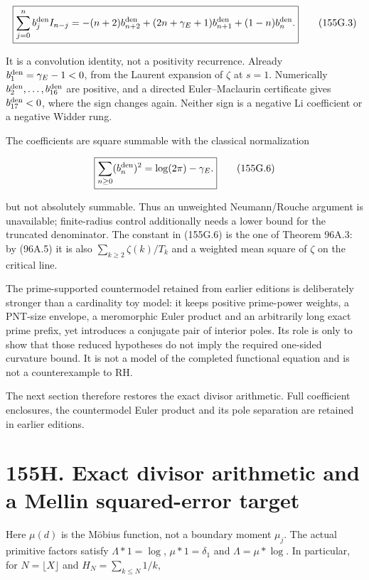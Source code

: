 \documentclass[
  11pt,
]{book}
\begin{document}
\[
\boxed{\sum_{j=0}^n b_j^{\rm den}I_{n-j}
=-(n+2)b_{n+2}^{\rm den}+(2n+\gamma_E+1)b_{n+1}^{\rm den}
 +(1-n)b_n^{\rm den}.}
\tag{155G.3}
\]

It is a convolution identity, not a positivity recurrence. Already
\(b_1^{\rm den}=\gamma_E-1<0\), from the Laurent expansion of \(\zeta\)
at \(s=1\). Numerically \(b_2^{\rm den},\ldots,b_{16}^{\rm den}\) are
positive, and a directed Euler--Maclaurin certificate gives
\(b_{17}^{\rm den}<0\), where the sign changes again. Neither sign is a
negative Li coefficient or a negative Widder rung.

The coefficients are square summable with the classical normalization

\[
\boxed{\sum_{n\ge0}(b_n^{\rm den})^2=\log(2\pi)-\gamma_E.}
\tag{155G.6}
\]

but not absolutely summable. Thus an unweighted Neumann/Rouche argument
is unavailable; finite-radius control additionally needs a lower bound
for the truncated denominator. The constant in (155G.6) is the one of
Theorem 96A.3: by (96A.5) it is also \(\sum_{k\ge2}\zeta(k)/T_k\) and a
weighted mean square of \(\zeta\) on the critical line.

The prime-supported countermodel retained from earlier editions is
deliberately stronger than a cardinality toy model: it keeps positive
prime-power weights, a PNT-size envelope, a meromorphic Euler product
and an arbitrarily long exact prime prefix, yet introduces a conjugate
pair of interior poles. Its role is only to show that those reduced
hypotheses do not imply the required one-sided curvature bound. It is
not a model of the completed functional equation and is not a
counterexample to RH.

The next section therefore restores the exact divisor arithmetic. Full
coefficient enclosures, the countermodel Euler product and its pole
separation are retained in earlier editions.

\section{155H. Exact divisor arithmetic and a Mellin squared-error
target}\label{h.-exact-divisor-arithmetic-and-a-mellin-squared-error-target}

Here \(\mu(d)\) is the Möbius function, not a boundary moment \(\mu_j\).
The actual primitive factors satisfy \(\Lambda*1=\log\),
\(\mu*1=\delta_1\) and \(\Lambda=\mu*\log\). In particular, for
\(N=\lfloor X\rfloor\) and \(H_N=\sum_{k\le N}1/k\),
\end{document}
